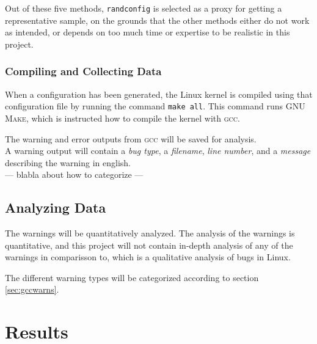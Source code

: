 \documentclass[a4paper,11pt]{report}
\newcommand{\textcode}[1]{\fboxsep=1pt\texttt{\colorbox{gray!20}{#1}}}
\begin{document}
Out of these five methods, \texttt{randconfig} is selected as a proxy for 
getting a representative sample, on the grounds that the other methods either
do not work as intended, or depends on too much time or expertise to be realistic 
in this project.

            \subsection{Compiling and Collecting Data}

When a configuration has been generated, the Linux kernel is compiled using 
that configuration file by running the command \textcode{make all}. This 
command runs \textsc{GNU Make}, which is instructed how to compile the kernel with
\textsc{gcc}.

The warning and error outputs from \textsc{gcc} will be saved for analysis.
\\

A warning output will contain a \emph{bug type}, a \emph{filename}, \emph{line 
number}, and a \emph{message} describing the warning in english.
\\

--- blabla about how to categorize ---


            \section{Analyzing Data}
The warnings will be quantitatively analyzed.  The analysis of the warnings is 
 quantitative, and this project will not contain in-depth analysis of 
any of the warnings in comparisson to\cite{42bugs}, which is a qualitative 
analysis of bugs in Linux.

The different warning types will be categorized according to section 
\ref{sec:gccwarns}.


\newpage
\chapter{Results}
\end{document}
